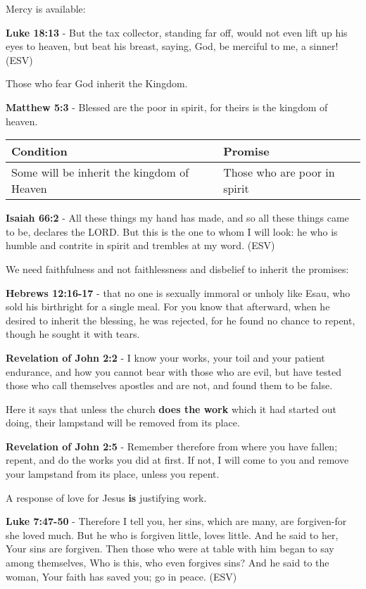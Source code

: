 \documentclass[11pt]{article}
\begin{document}
Mercy is available:

\textbf{Luke 18:13} - But the tax collector, standing far off, would not even lift up his eyes to heaven, but beat his breast, saying, God, be merciful to me, a sinner! (ESV)

Those who fear God inherit the Kingdom.

\textbf{Matthew 5:3} - Blessed are the poor in spirit, for theirs is the kingdom of heaven.

\begin{center}
\begin{tabular}{ll}
Condition & Promise\\[0pt]
\hline
Some will be inherit the kingdom of Heaven & Those who are poor in spirit\\[0pt]
\end{tabular}
\end{center}

\textbf{Isaiah 66:2} - All these things my hand has made, and so all these things came to be, declares the LORD. But this is the one to whom I will look: he who is humble and contrite in spirit and trembles at my word. (ESV)

We need faithfulness and not faithlessness and disbelief to inherit the promises:

\textbf{Hebrews 12:16-17} - that no one is sexually immoral or unholy like Esau, who sold his birthright for a single meal. For you know that afterward, when he desired to inherit the blessing, he was rejected, for he found no chance to repent, though he sought it with tears.

\textbf{Revelation of John 2:2} - I know your works, your toil and your patient endurance, and how you cannot bear with those who are evil, but have tested those who call themselves apostles and are not, and found them to be false.

Here it says that unless the church \textbf{does the work} which it had started out doing, their lampstand will be removed from its place.

\textbf{Revelation of John 2:5} - Remember therefore from where you have fallen; repent, and do the works you did at first. If not, I will come to you and remove your lampstand from its place, unless you repent.

A response of love for Jesus \textbf{is} justifying work.

\textbf{Luke 7:47-50} - Therefore I tell you, her sins, which are many, are forgiven-for she loved much. But he who is forgiven little, loves little. And he said to her, Your sins are forgiven. Then those who were at table with him began to say among themselves, Who is this, who even forgives sins? And he said to the woman, Your faith has saved you; go in peace. (ESV)
\end{document}
